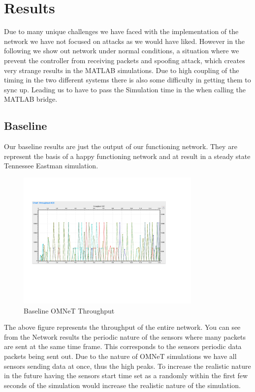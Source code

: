 \section{Results}
Due to many unique challenges we have faced with the implementation of the network we have not focused on attacks as we would have liked. However in the following we show out network under normal conditions, a situation where we prevent the controller from receiving packets and spoofing attack, which creates very strange results in the MATLAB simulations. Due to high coupling of the timing in the two different systems there is also some difficulty in getting them to sync up. Leading us to have to pass the Simulation time in the when calling the MATLAB	 bridge. 
 
\subsection{Baseline}

Our baseline results are just the output of our functioning network. They are represent the basis of a happy functioning network and at result in a steady state Tennessee Eastman simulation. 

\begin{figure}[ht!]
        \centering
		\includegraphics[width=90mm]{figs/Baseline_Omnet.png}
        \caption{Baseline OMNeT Throughput}
        \label{fig:BaselineOMNeT}        
\end{figure}

The above figure represents the throughput of the entire network. You can see from the Network results the periodic nature of the sensors where many packets are sent at the same time frame. This corresponds to the sensors periodic data packets being sent out. Due to the nature of OMNeT simulations we have all sensors sending data at once, thus the high peaks. To increase the realistic nature in the future having the sensors start time set as a randomly within the first few seconds of the simulation would increase the realistic nature of the simulation. 

